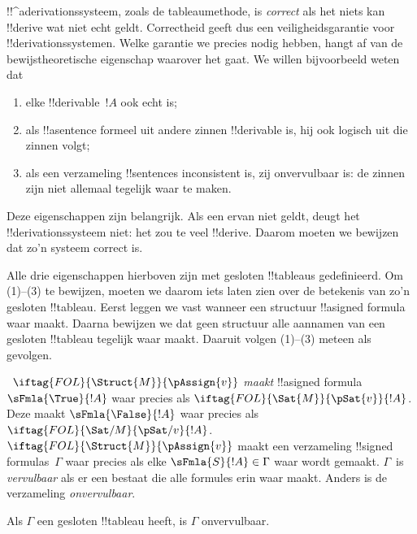 \documentclass[openany]{memoir}
\begin{document}
\begin{explain}
!!^a{derivation}ssysteem, zoals de tableaumethode, is \emph{correct}
als het niets kan !!{derive} wat niet echt geldt. Correctheid geeft dus
een veiligheidsgarantie voor !!{derivation}ssystemen. Welke garantie
we precies nodig hebben, hangt af van de bewijstheoretische eigenschap
waarover het gaat. We willen bijvoorbeeld weten dat
\begin{enumerate}
\item elke !!{derivable}~$!A$ ook echt
   is;
\item als !!a{sentence} formeel uit andere zinnen !!{derivable} is, hij
  ook logisch uit die zinnen volgt;
\item als een verzameling !!{sentence}s inconsistent is, zij
  onvervulbaar is: de zinnen zijn niet allemaal tegelijk waar te maken.
\end{enumerate}
Deze eigenschappen zijn belangrijk. Als een ervan niet geldt, deugt
het !!{derivation}ssysteem niet: het zou te veel !!{derive}. Daarom
moeten we bewijzen dat zo'n systeem correct is.

Alle drie eigenschappen hierboven zijn met gesloten !!{tableau}s
gedefinieerd. Om (1)--(3) te bewijzen, moeten we daarom iets laten zien
over de betekenis van zo'n gesloten !!{tableau}. Eerst leggen we vast
wanneer een structuur !!a{signed formula} waar maakt. Daarna bewijzen
we dat geen structuur alle aannamen van een gesloten !!{tableau}
tegelijk waar maakt. Daaruit volgen (1)--(3) meteen als gevolgen.
\end{explain}

\begin{defn}
~$\iftag{FOL}{\Struct{M}}{\pAssign{v}}$
\emph{maakt} !!a{signed formula} $\sFmla{\True}{!A}$ waar
precies als $\iftag{FOL}{\Sat{M}}{\pSat{v}}{!A}$. Deze maakt
$\sFmla{\False}{!A}$ waar precies als
$\iftag{FOL}{\Sat/{M}}{\pSat/{v}}{!A}$. $\iftag{FOL}{\Struct{M}}{\pAssign{v}}$
maakt een verzameling !!{signed formula}s~$\Gamma$ waar precies als
elke $\sFmla{S}{!A} \in \Gamma$ waar wordt gemaakt. $\Gamma$~is
\emph{vervulbaar} als er een
 bestaat die alle formules
erin waar maakt. Anders is de verzameling \emph{onvervulbaar}.
\end{defn}

\begin{thm}[Correctheid]
  Als $\Gamma$ een gesloten !!{tableau} heeft, is $\Gamma$
  onvervulbaar.
\end{thm}
\end{document}
